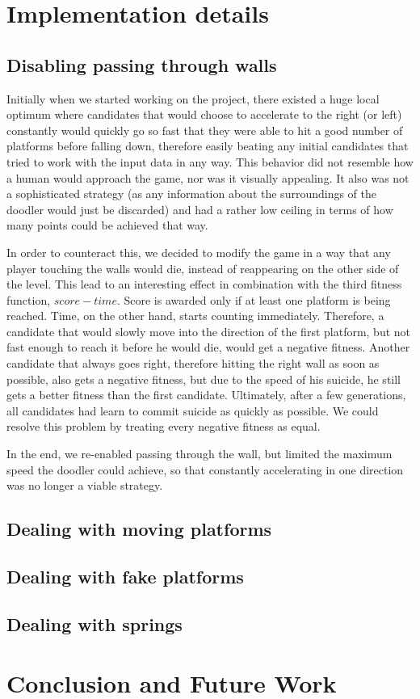 \documentclass[a4paper,12pt,pagesize,headsepline,bibtotoc,titlepage,abstracton]{scrartcl}
\begin{document}
\section{Implementation details}
\label{sec:id}
\subsection{Disabling passing through walls}

Initially when we started working on the project, there existed a huge local optimum where candidates that would choose to accelerate to the right (or left) constantly would quickly go so fast that they were able to hit a good number of platforms before falling down, therefore easily beating any initial candidates that tried to work with the input data in any way. This behavior did not resemble how a human would approach the game, nor was it visually appealing. It also was not a sophisticated strategy (as any information about the surroundings of the doodler would just be discarded) and had a rather low ceiling in terms of how many points could be achieved that way.

In order to counteract this, we decided to modify the game in a way that any player touching the walls would die, instead of reappearing on the other side of the level. This lead to an interesting effect in combination with the third fitness function, $score - time$. Score is awarded only if at least one platform is being reached. Time, on the other hand, starts counting immediately. Therefore, a candidate that would slowly move into the direction of the first platform, but not fast enough to reach it before he would die, would get a negative fitness. Another candidate that always goes right, therefore hitting the right wall as soon as possible, also gets a negative fitness, but due to the speed of his suicide, he still gets a better fitness than the first candidate. Ultimately, after a few generations, all candidates had learn to commit suicide as quickly as possible. We could resolve this problem by treating every negative fitness as equal.

In the end, we re-enabled passing through the wall, but limited the maximum speed the doodler could achieve, so that constantly accelerating in one direction was no longer a viable strategy.

\subsection{Dealing with moving platforms}
\subsection{Dealing with fake platforms}
\subsection{Dealing with springs}
\section{Conclusion and Future Work}
\label{sec:cafw}

\newpage

 
\end{document}
